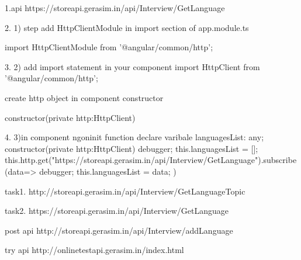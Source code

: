 1.api
https://storeapi.gerasim.in/api/Interview/GetLanguage

2.
1) step add HttpClientModule in import section of app.module.ts

import {HttpClientModule } from '@angular/common/http';

3.
2) add import statement in your component
import { HttpClient } from '@angular/common/http';

create http object in component constructor

constructor(private http:HttpClient) { 
  }

4.
3)in component ngoninit function
declare varibale  languagesList: any;
constructor(private http:HttpClient) {
    debugger;
    this.languagesList = [];
  }
 this.http.get("https://storeapi.gerasim.in/api/Interview/GetLanguage").subscribe(data=> {
      debugger;
      this.languagesList = data;
    })


task1.
http://storeapi.gerasim.in/api/Interview/GetLanguageTopic

task2.
https://storeapi.gerasim.in/api/Interview/GetLanguage



post api
http://storeapi.gerasim.in/api/Interview/addLanguage



try api
http://onlinetestapi.gerasim.in/index.html

